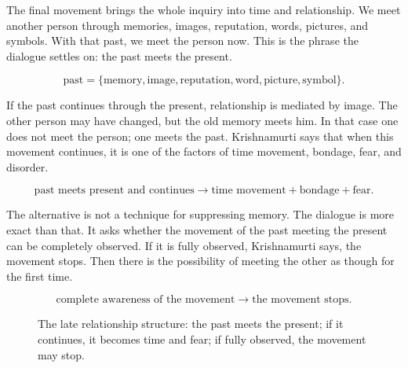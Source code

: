 The final movement brings the whole inquiry into time and relationship. We meet another person through memories, images, reputation, words, pictures, and symbols. With that past, we meet the person now. This is the phrase the dialogue settles on: the past meets the present.

\begin{equation}
\text{past}
=
\{\text{memory},\text{image},\text{reputation},\text{word},\text{picture},\text{symbol}\}.
\end{equation}

If the past continues through the present, relationship is mediated by image. The other person may have changed, but the old memory meets him. In that case one does not meet the person; one meets the past. Krishnamurti says that when this movement continues, it is one of the factors of time movement, bondage, fear, and disorder.

\begin{equation}
\text{past meets present and continues}
\longrightarrow
\text{time movement}+\text{bondage}+\text{fear}.
\end{equation}

The alternative is not a technique for suppressing memory. The dialogue is more exact than that. It asks whether the movement of the past meeting the present can be completely observed. If it is fully observed, Krishnamurti says, the movement stops. Then there is the possibility of meeting the other as though for the first time.

\begin{equation}
\text{complete awareness of the movement}
\longrightarrow
\text{the movement stops}.
\end{equation}

\begin{figure}
\centering
{}
\caption{The late relationship structure: the past meets the present; if it continues, it becomes time and fear; if fully observed, the movement may stop.}
\end{figure}

